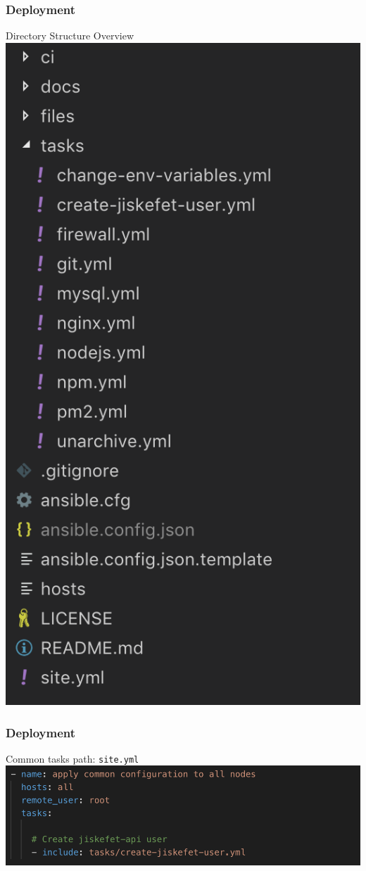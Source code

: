 \documentclass[12pt]{beamer}
\begin{document}
    \begin{frame}
        \frametitle{Deployment}
        Directory Structure Overview
        \newline
   		\includegraphics[scale=.38]{assets/deploy_dirstruct.png}
    \end{frame}

    \begin{frame}
        \frametitle{Deployment}
        Common tasks
        \newline
        path: \texttt{site.yml}
        \newline
   		\includegraphics[scale=.40]{assets/deploy_create_user.png}
    \end{frame}
    
\end{document}
